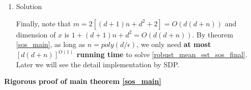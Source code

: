 {\begin{enumerate}
\begin{enumerate}
        By \eqref{cauchy_schwarz_les} we have
        \begin{equation}
        \begin{split}
            &\|\mb EX'-\mb E Y\|^4 \preccurlyeq \epsilon \cdot \mb E \langle X' - Y, \mb E X' - \mb E Y \rangle^2~~~~w.h.p.\text{( of $X_i'$)}.
        \end{split}
        \end{equation}
        By \eqref{sos_les} we have
        \begin{equation}
        \begin{split}
            \mb E \langle X' - Y, \mb E X' - \mb E Y \rangle^2 \preccurlyeq O(1)\cdot [ \|\mb E X' - \mb E Y\|^2 +  \|\mb E X' - \mb E Y\|^4]~~~~w.h.p.\text{( of $X_i'$)}.
        \end{split}
        \end{equation}
        Therefore, $\|\mb EX'-\mb E Y\|^4 \preccurlyeq O(\epsilon)\cdot \|\mb EX'-\mb E Y\|^2~~w.h.p.$, and thus we have $\|\bar{X'}-y\|^4\preccurlyeq O(\epsilon) \|\bar{X'}-y\|^2~~w.h.p.$, where $\bar{X'}=\frac{1}{n}\sum_{i=1}^n X_i'$.
        
        Note that, max degree of all the polynomials appeared in the proof above is $6$, thus it is a degree-$6$ SOS proof. Therefore we have
        \begin{equation}
        \label{robust_mean_est_sos_final}
            \mc A \vdash_6 \|\bar{X'}-y\|^4\preccurlyeq O(\epsilon) \|\bar{X'}-y\|^2~~~~w.h.p.\text{( of $X_i'$)}.
        \end{equation}
        Though the $RHS$ is slightly different from $p(x)$ defined in \eqref{robust_mean_est_sos}, the two polynomial are equivalent, since $\|\mu-\bar{X'}\|\le \sqrt{\epsilon}~~w.h.p.$ by concentration.

    \end{enumerate}

    \item Solution
    
    Finally, note that $m=2[(d+1)n+d^2+2]=O(d(d+n))$ and dimension of $x$ is $1+(d+1)n+d^2=O(d(d+n))$.
    By theorem \ref{sos_main}, as long as $n=poly(d/\epsilon)$, we only need \textbf{at most $[d(d+n)]^{O(1)}$ running time} to solve \eqref{robust_mean_est_sos_final}.
    Later we will see the detail implementation by SDP.
\end{enumerate}
}

\bigskip

\textbf{Rigorous proof of main theorem \ref{sos_main}}

